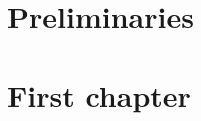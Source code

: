 \documentclass[a4paper,12pt]{memoir}
\numberwithin{equation}{section} %
\theoremstyle{plain} %
\theoremstyle{definition} %
\theoremstyle{remark} %
\begin{document}
\chapter{Preliminaries}


\chapter{First chapter}




\appendix %


\backmatter





\end{document}
